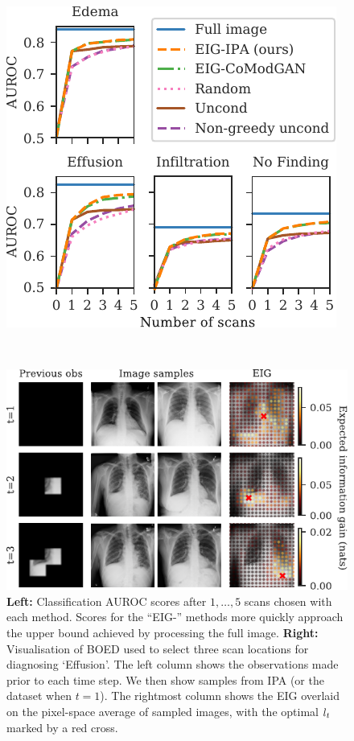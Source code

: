 \begin{figure}[t]
  \centering
  \hspace{-.75cm}
  \begin{minipage}{.4\textwidth}
    \centering
    \includegraphics[scale=.77]{figs/cigcvae/boed-auroc-curve-rearranged}
  \end{minipage}
  ~
  \begin{minipage}{0.54\textwidth}
    \centering
    \includegraphics[scale=.77]{figs/cigcvae/shrunk-boed-vis}
  \end{minipage}
  \caption{\textbf{Left:} Classification AUROC scores after $1,\ldots,5$ scans
    chosen with each method. Scores for the ``EIG-'' methods more quickly approach the
    upper bound achieved by processing the full image. \textbf{Right:}
    Visualisation of BOED used to select three scan locations for diagnosing
    `Effusion'. The left column shows the observations made prior to each time
    step. We then show samples from IPA (or the dataset when $t=1$). The
    rightmost column shows the EIG overlaid on the pixel-space average of
    sampled images, with the optimal $l{}_t$ marked by a red cross.}
  \label{fig:cigcvae-boed}
  \vspace{-.4cm}
\end{figure}



